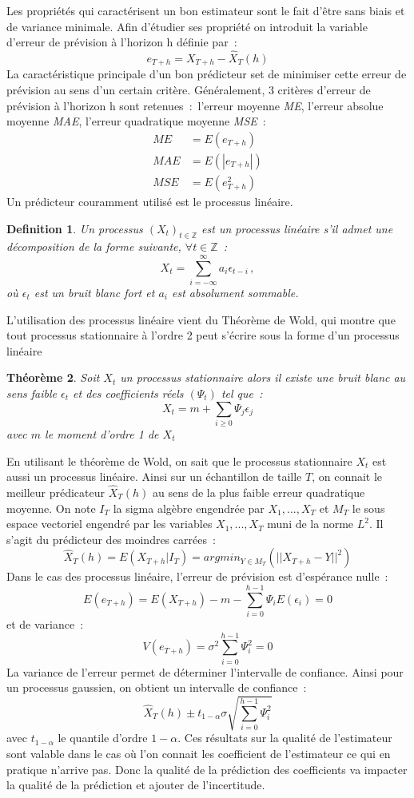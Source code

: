 \documentclass[11pt]{scrartcl} %
\newtheorem{theorem}{Théorème}[section]
\newtheorem{Def}[theorem]{Definition}
\newcommand{\Xt}{\left(X_t\right)_{t\in\mathbb{Z}}}
\newcommand{\Z}{\mathbb{Z}}
\begin{document}
Les propriétés qui caractérisent un bon estimateur sont le fait d'être sans biais et de variance minimale. Afin d'étudier ses propriété on introduit la variable d'erreur de prévision à l'horizon h définie par~:
$$
e_{T+h} = X_{T+h}-\hat{X}_T(h)
$$
La caractéristique principale d'un bon prédicteur set de minimiser cette erreur de prévision au sens d'un certain critère. Généralement, 3 critères d'erreur de prévision à l'horizon h sont retenues~:~l'erreur moyenne \textit{ME}, l'erreur absolue moyenne \textit{MAE}, l'erreur quadratique moyenne \textit{MSE}~:
\begin{align*}
ME&=E\left(e_{T+h}\right)\\
MAE&=E\left(\left|e_{T+h}\right|\right)\\
MSE&=E\left(e_{T+h}^2\right)
\end{align*}
Un prédicteur couramment utilisé est le processus linéaire. 
\begin{Def}
Un processus $\Xt$ est un processus linéaire s'il admet une décomposition de la forme suivante, $\forall t \in \Z$~:
$$
X_t = \sum_{i=-\infty}^{\infty}a_i\epsilon_{t-i}\,,
$$
où $\epsilon_t$ est un bruit blanc fort et $a_i$ est absolument sommable.
\end{Def}
L'utilisation des processus linéaire vient du Théorème de Wold, qui montre que tout processus stationnaire à l'ordre 2 peut s'écrire sous la forme d'un processus linéaire
\begin{theorem}\label{Wold}
Soit $X_t$ un processus stationnaire alors il existe une bruit blanc au sens faible $\epsilon_t$ et des coefficients réels $\left(\Psi_t\right)$ tel que~:
$$
X_t = m+\sum_{i\geq 0}\Psi_j\epsilon_j
$$
avec $m$ le moment d'ordre 1 de $X_t$
\end{theorem}
En utilisant le théorème de Wold, on sait que le processus stationnaire $X_t$ est aussi un processus linéaire. Ainsi sur un échantillon de taille $T$, on connait le meilleur prédicateur $\hat{X}_T(h)$ au sens de la plus faible erreur quadratique moyenne. On note $I_T$ la sigma algèbre engendrée par $X_1,...,X_T$ et $M_T$ le sous espace vectoriel engendré par les variables $X_1,...,X_T$ muni de la norme $L^2$. Il s'agit du prédicteur des moindres carrées~:
$$
\hat{X}_T(h)=E\left(X_{T+h}|I_T\right)=argmin_{Y\in M_T}\left(||X_{T+h}-Y||^2\right)
$$
Dans le cas des processus linéaire, l'erreur de prévision est d'espérance nulle~:
$$
E(e_{T+h}) = E(X_{T+h})-m-\sum_{i= 0}^{h-1}\Psi_iE(\epsilon_{i})=0
$$
et de variance~:
$$
V(e_{T+h}) = \sigma^2\sum_{i=0}^{h-1}\Psi_i^2=0
$$
La variance de l'erreur permet de déterminer l'intervalle de confiance. Ainsi pour un processus gaussien, on obtient un intervalle de confiance~:
$$
\hat{X}_T(h)\pm t_{1-\alpha}\sigma\sqrt{\sum_{i=0}^{h-1}\Psi_i^2}
$$
avec $t_{1-\alpha}$ le quantile d'ordre $1-\alpha$. Ces résultats sur la qualité de l'estimateur sont valable dans le cas où l'on connait les coefficient de l'estimateur ce qui en pratique n'arrive pas. Donc la qualité de la prédiction des coefficients va impacter la qualité de la prédiction et ajouter de l'incertitude.
\end{document}
